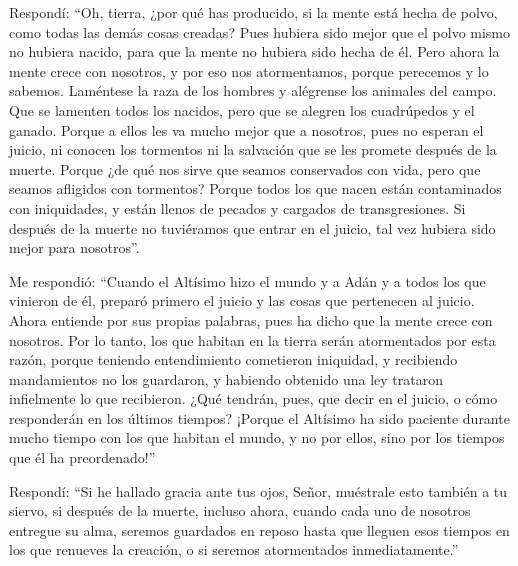  Respondí: ``Oh, tierra, ¿por qué has producido, si la
mente está hecha de polvo, como todas las demás cosas creadas?
 Pues hubiera sido mejor que el polvo mismo no hubiera
nacido, para que la mente no hubiera sido hecha de él. 
Pero ahora la mente crece con nosotros, y por eso nos atormentamos,
porque perecemos y lo sabemos.  Laméntese la raza de los
hombres y alégrense los animales del campo. Que se lamenten todos los
nacidos, pero que se alegren los cuadrúpedos y el ganado.
 Porque a ellos les va mucho mejor que a nosotros, pues
no esperan el juicio, ni conocen los tormentos ni la salvación que se
les promete después de la muerte.  Porque ¿de qué nos
sirve que seamos conservados con vida, pero que seamos afligidos con
tormentos?  Porque todos los que nacen están contaminados
con iniquidades, y están llenos de pecados y cargados de transgresiones.
 Si después de la muerte no tuviéramos que entrar en el
juicio, tal vez hubiera sido mejor para nosotros''.

 Me respondió: ``Cuando el Altísimo hizo el mundo y a
Adán y a todos los que vinieron de él, preparó primero el juicio y las
cosas que pertenecen al juicio.  Ahora entiende por sus
propias palabras, pues ha dicho que la mente crece con nosotros.
 Por lo tanto, los que habitan en la tierra serán
atormentados por esta razón, porque teniendo entendimiento cometieron
iniquidad, y recibiendo mandamientos no los guardaron, y habiendo
obtenido una ley trataron infielmente lo que recibieron. 
¿Qué tendrán, pues, que decir en el juicio, o cómo responderán en los
últimos tiempos?  ¡Porque el Altísimo ha sido paciente
durante mucho tiempo con los que habitan el mundo, y no por ellos, sino
por los tiempos que él ha preordenado!''

 Respondí: ``Si he hallado gracia ante tus ojos, Señor,
muéstrale esto también a tu siervo, si después de la muerte, incluso
ahora, cuando cada uno de nosotros entregue su alma, seremos guardados
en reposo hasta que lleguen esos tiempos en los que renueves la
creación, o si seremos atormentados inmediatamente.''

